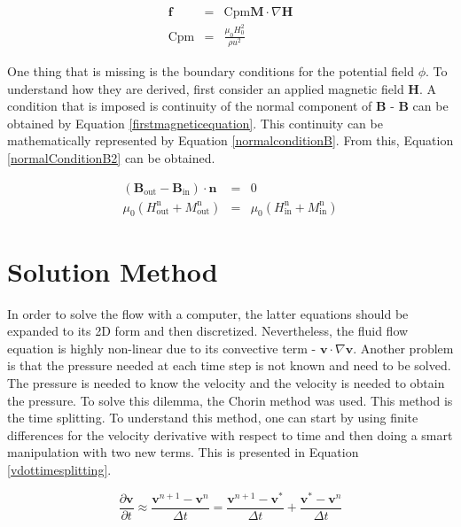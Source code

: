 \documentclass[journal]{IEEEtran}
\begin{document}
\begin{eqnarray}
\mathbf{f} & = & \mathrm{Cpm} \mathbf{M}\cdot \nabla \mathbf{H}\label{magneticforce}\\
\mathrm{Cpm} & = & \frac{\mu_0 H_0^2}{\rho u^2}\label{cpm}
\end{eqnarray}


One thing that is missing is the boundary conditions for the potential field $\phi$. To understand how they are derived, first consider an applied magnetic field $\mathbf{H}$. A condition that is imposed is continuity of the normal component of $\mathbf{B}$ - $\mathbf{B}$ can be obtained by Equation \ref{firstmagneticequation}. This continuity can be mathematically represented by Equation \ref{normalconditionB}. From this, Equation \ref{normalConditionB2} can be obtained.

\begin{eqnarray}
\left(\mathbf{B}_{\mathrm{out}} - \mathbf{B}_{\mathrm{in}}\right)\cdot \mathbf{n} &=& 0 \label{normalconditionB}\\
\mu_0 (H_{\mathrm{out}}^{\mathrm{n}} + M_{\mathrm{out}}^{\mathrm{n}}) &=&  \mu_0(H_{\mathrm{in}}^{\mathrm{n}}+M_{\mathrm{in}}^{\mathrm{n}})\label{normalConditionB2}
\end{eqnarray}

\section{Solution Method}

In order to solve the flow with a computer, the latter equations should be expanded to its 2D form and then discretized. Nevertheless, the fluid flow equation is highly non-linear due to its convective term - $\mathbf{v}\cdot \nabla \mathbf{v}$. Another problem is that the pressure needed at each time step is not known and need to be solved. The pressure is needed to know the velocity and the velocity is needed to obtain the pressure. To solve this dilemma, the Chorin method \cite{Chorin1997118} was used. This method is the time splitting. To understand this method, one can start by using finite differences for the velocity derivative with respect to time and then doing a smart manipulation with two new terms. This is presented in Equation \ref{vdottimesplitting}.

\begin{equation}
\frac{\partial \textbf{v}}{\partial t}\approx \frac{\textbf{v}^{n+1}-\textbf{v}^n}{\Delta t}=\frac{\textbf{v}^{n+1}-\textbf{v}^*}{\Delta t}+\frac{\textbf{v}^{*}-\textbf{v}^n}{\Delta t} \label{vdottimesplitting}
\end{equation}
\end{document}
